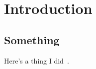 \chapter{Introduction} 
\label{ch:introduction}

\minitoc
\section{Something}
Here's a thing I did~\cite{LHCb-PAPER-2017-032}. 


